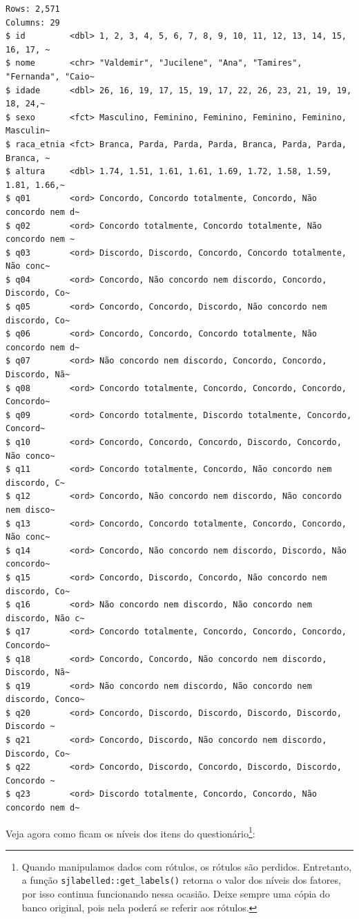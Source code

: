 \documentclass[
  letterpaper,
  DIV=11,
  numbers=noendperiod]{scrartcl}
\begin{document}
\begin{verbatim}
Rows: 2,571
Columns: 29
$ id         <dbl> 1, 2, 3, 4, 5, 6, 7, 8, 9, 10, 11, 12, 13, 14, 15, 16, 17, ~
$ nome       <chr> "Valdemir", "Jucilene", "Ana", "Tamires", "Fernanda", "Caio~
$ idade      <dbl> 26, 16, 19, 17, 15, 19, 17, 22, 26, 23, 21, 19, 19, 18, 24,~
$ sexo       <fct> Masculino, Feminino, Feminino, Feminino, Feminino, Masculin~
$ raca_etnia <fct> Branca, Parda, Parda, Parda, Branca, Parda, Parda, Branca, ~
$ altura     <dbl> 1.74, 1.51, 1.61, 1.61, 1.69, 1.72, 1.58, 1.59, 1.81, 1.66,~
$ q01        <ord> Concordo, Concordo totalmente, Concordo, Não concordo nem d~
$ q02        <ord> Concordo totalmente, Concordo totalmente, Não concordo nem ~
$ q03        <ord> Discordo, Discordo, Concordo, Concordo totalmente, Não conc~
$ q04        <ord> Concordo, Não concordo nem discordo, Concordo, Discordo, Co~
$ q05        <ord> Concordo, Concordo, Discordo, Não concordo nem discordo, Co~
$ q06        <ord> Concordo, Concordo, Concordo totalmente, Não concordo nem d~
$ q07        <ord> Não concordo nem discordo, Concordo, Concordo, Discordo, Nã~
$ q08        <ord> Concordo totalmente, Concordo, Concordo, Concordo, Concordo~
$ q09        <ord> Concordo totalmente, Discordo totalmente, Concordo, Concord~
$ q10        <ord> Concordo, Concordo, Concordo, Discordo, Concordo, Não conco~
$ q11        <ord> Concordo totalmente, Concordo, Não concordo nem discordo, C~
$ q12        <ord> Concordo, Não concordo nem discordo, Não concordo nem disco~
$ q13        <ord> Concordo, Concordo totalmente, Concordo, Concordo, Não conc~
$ q14        <ord> Concordo, Não concordo nem discordo, Discordo, Não concordo~
$ q15        <ord> Concordo, Discordo, Concordo, Não concordo nem discordo, Co~
$ q16        <ord> Não concordo nem discordo, Não concordo nem discordo, Não c~
$ q17        <ord> Concordo totalmente, Concordo, Concordo, Concordo, Concordo~
$ q18        <ord> Concordo, Concordo, Não concordo nem discordo, Discordo, Nã~
$ q19        <ord> Não concordo nem discordo, Não concordo nem discordo, Conco~
$ q20        <ord> Concordo, Discordo, Discordo, Discordo, Discordo, Discordo ~
$ q21        <ord> Concordo, Discordo, Não concordo nem discordo, Discordo, Co~
$ q22        <ord> Concordo, Discordo, Concordo, Discordo, Discordo, Concordo ~
$ q23        <ord> Discordo totalmente, Concordo, Concordo, Não concordo nem d~
\end{verbatim}

Veja agora como ficam os níveis dos itens do questionário\footnote{Quando
  manipulamos dados com rótulos, os rótulos são perdidos. Entretanto, a
  função \texttt{sjlabelled::get\_labels()} retorna o valor dos níveis
  dos fatores, por isso continua funcionando nessa ocasião. Deixe sempre
  uma cópia do banco original, pois nela poderá se referir aos rótulos.}:
\end{document}
